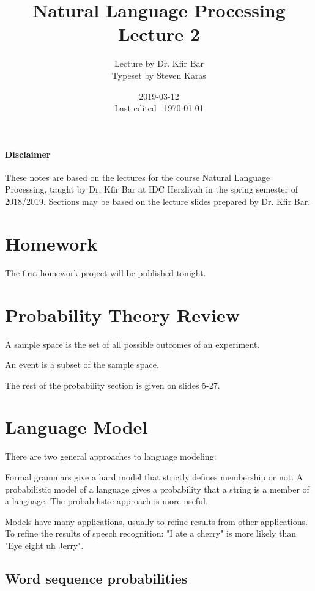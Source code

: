 \documentclass{idc_msc}
\title{Natural Language Processing \\\large Lecture 2}
\date{2019-03-12 \\ Last edited \currenttime\ \today}
\author{Lecture by Dr. Kfir Bar\\Typeset by Steven Karas}
\begin{document}
\paragraph{Disclaimer}

These notes are based on the lectures for the course Natural Language Processing, taught by Dr. Kfir Bar at IDC Herzliyah in the spring semester of 2018/2019.
Sections may be based on the lecture slides prepared by Dr. Kfir Bar.

\nocite{Jurafsky:2009:SLP:0131873210}
\nocite{manning1999foundations}
\nocite{DBLP:journals/corr/Goldberg15c}

\section{Homework}

The first homework project will be published tonight.

\section{Probability Theory Review}

A sample space is the set of all possible outcomes of an experiment.

An event is a subset of the sample space.

The rest of the probability section is given on slides 5-27.

\section{Language Model}

There are two general approaches to language modeling:

Formal grammars give a hard model that strictly defines membership or not.
A probabilistic model of a language gives a probability that a string is a member of a language.
The probabilistic approach is more useful.

Models have many applications, usually to refine results from other applications.
To refine the results of speech recognition: "I ate a cherry" is more likely than "Eye eight uh Jerry".

\subsection{Word sequence probabilities}
\end{document}
